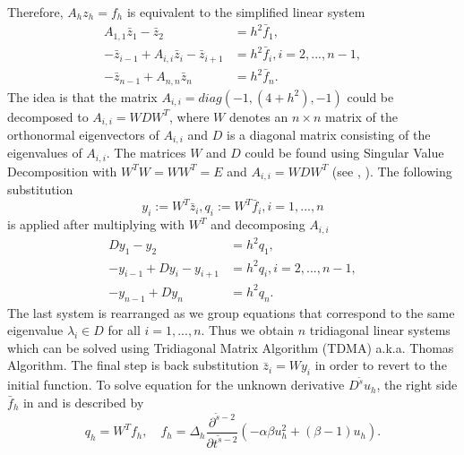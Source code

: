 \documentclass[11pt,a4paper,twoside]{article}
\begin{document}
Therefore, $A_h z_h = f_h$ is equivalent to the simplified linear system
\begin{align}
A_{1,1}\bar z_1 - \bar z_2 &= h^2\bar f_1, \nonumber \\
- \bar z_{i-1}  + A_{i,i}\bar z_i - \bar z_{i+1}  &= h^2\bar f_i, i = 2,...,n-1, \nonumber \\
- \bar z_{n-1} + A_{n,n}\bar z_n &= h^2\bar f_n.\label{LinSys}
\end{align}
The idea is that the matrix $A_{i,i} = diag(-1, (4+h^2), -1)$ could be decomposed to $A_{i,i}  = W D W^T$, where $W$ denotes an $n \times n$ matrix of the orthonormal eigenvectors of $A_{i,i} $ and $ D$ is a diagonal matrix consisting of the eigenvalues of $A_{i,i}$. The matrices $W$ and $D$ could be found using Singular Value Decomposition with $W^T W = W W^T = E$ and $A_{i,i} = WDW^T$ (see \cite{Tref}, \cite{FPS}). The following substitution 
\begin{equation}\label{subst}
y_i := W^T \bar z_i, q_i := W^T \bar f_i, i = 1, ...,n
\end{equation}
is applied after multiplying  with $W^T$ and decomposing $A_{i,i}$
\begin{align}
Dy_1 - y_2 &= h^2 q_1,\nonumber \\
-y_{i-1} + D y_i - y_{i+1} &= h^2 q_i, i = 2,...,n-1,\nonumber \\
- y_{n-1} + Dy_n &= h^2 q_n.\label{SubSys}
\end{align}
The last system  is rearranged as we group equations that correspond to the same eigenvalue $\lambda_i \in D$ for all $i = 1,...,n$. Thus we obtain $n$ tridiagonal linear systems which can be solved using Tridiagonal Matrix Algorithm (TDMA) a.k.a. Thomas Algorithm. The final step is back substitution $\bar z_i = W y_i$ in order to revert to the initial function. To solve equation  for the unknown derivative $D^{\tilde s}u_h$, the right side $\bar f_h$  in  and  is described by
$$
q_h = W^T f_h, \quad f_h = \Delta_h \frac{ \partial^{ \tilde s - 2 } } { \partial t^{ \tilde s - 2 } } ( -\alpha \beta u_h^2  + (\beta -1)u_h).
$$

\end{document}
